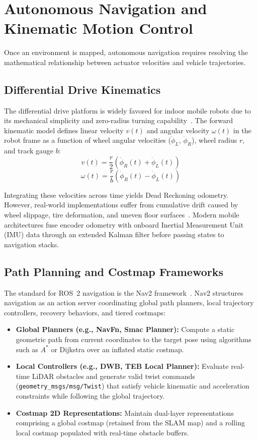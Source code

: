 \section{Autonomous Navigation and Kinematic Motion Control}
Once an environment is mapped, autonomous navigation requires resolving the mathematical relationship between actuator velocities and vehicle trajectories.

\subsection{Differential Drive Kinematics}
The differential drive platform is widely favored for indoor mobile robots due to its mechanical simplicity and zero-radius turning capability~\citep{siegwart2011introduction}. The forward kinematic model defines linear velocity $v(t)$ and angular velocity $\omega(t)$ in the robot frame as a function of wheel angular velocities ($\dot{\phi}_L$, $\dot{\phi}_R$), wheel radius $r$, and track gauge $b$:
\begin{equation}
    v(t) = \frac{r}{2} \left( \dot{\phi}_R(t) + \dot{\phi}_L(t) \right)
\end{equation}
\begin{equation}
    \omega(t) = \frac{r}{b} \left( \dot{\phi}_R(t) - \dot{\phi}_L(t) \right)
\end{equation}

Integrating these velocities across time yields Dead Reckoning odometry. However, real-world implementations suffer from cumulative drift caused by wheel slippage, tire deformation, and uneven floor surfaces~\citep{siegwart2011introduction}. Modern mobile architectures fuse encoder odometry with onboard Inertial Measurement Unit (IMU) data through an extended Kalman filter before passing states to navigation stacks.

\subsection{Path Planning and Costmap Frameworks}
The standard for ROS~2 navigation is the Nav2 framework~\citep{openrobotics2024nav2}. Nav2 structures navigation as an action server coordinating global path planners, local trajectory controllers, recovery behaviors, and tiered costmaps:
\begin{itemize}
    \item \textbf{Global Planners (e.g., NavFn, Smac Planner):} Compute a static geometric path from current coordinates to the target pose using algorithms such as $A^*$ or Dijkstra over an inflated static costmap.
    \item \textbf{Local Controllers (e.g., DWB, TEB Local Planner):} Evaluate real-time LiDAR obstacles and generate valid twist commands (\texttt{geometry\_msgs/}\allowbreak\texttt{msg/}\allowbreak\texttt{Twist}) that satisfy vehicle kinematic and acceleration constraints while following the global trajectory.
    \item \textbf{Costmap 2D Representations:} Maintain dual-layer representations comprising a global costmap (retained from the SLAM map) and a rolling local costmap populated with real-time obstacle buffers.
\end{itemize}

